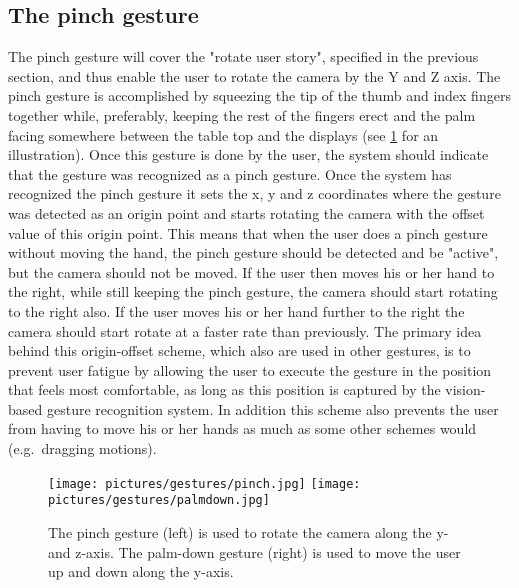 \subsection{The pinch gesture}
The pinch gesture will cover the "rotate user story", specified in the previous section, and thus enable the user to rotate the camera by the Y and Z axis. 
The pinch gesture is accomplished by squeezing the tip of the thumb and index fingers together while, preferably, keeping the rest of the fingers erect and the palm facing 
somewhere between the table top and the displays (see \ref{fig:gestures1} for an illustration). Once this gesture is done by the user, 
the system should indicate that the gesture was recognized as a pinch gesture.
Once the system has recognized the pinch gesture it sets the x, y and z coordinates where the gesture was detected as an origin point and starts rotating the 
camera with the offset value of this origin point. This means that when the user does a pinch gesture without moving the hand, the pinch gesture should be detected and be
"active", but the camera should not be moved. If the user then moves his or her hand to the right, while still keeping the pinch gesture, the camera should start rotating 
to the right also. If the user moves his or her hand further to the right the camera should start rotate at a faster rate than previously.  
The primary idea behind this origin-offset scheme, which also are used in other gestures, is to prevent user fatigue by allowing the user to execute
the gesture in the position that feels most comfortable, as long as this position is captured by the vision-based gesture recognition system. 
In addition this scheme also prevents the user from having to move his or her hands as much as some other schemes would (e.g.~dragging motions).  

\begin{figure}%
	\texttt{[image: pictures/gestures/pinch.jpg]}
    \texttt{[image: pictures/gestures/palmdown.jpg]}
	\caption[The pinch and palm-down gestures]{The pinch gesture (left) is used to rotate the camera along the y- and z-axis. 
             The palm-down gesture (right) is used to move the user up and down along the y-axis.}
	\label{fig:gestures1}
\end{figure} 

